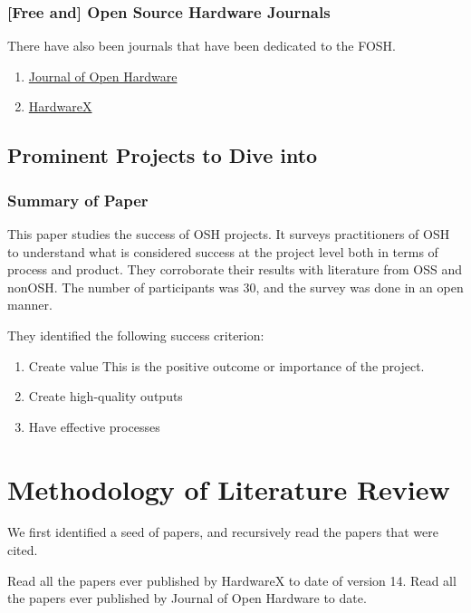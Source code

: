 \documentclass{article}
\begin{document}
\subsubsection{[Free and] Open Source Hardware Journals}
There have also been journals that have been dedicated to the FOSH.
\begin{enumerate}
    \item \href{https://openhardware.metajnl.com/}{Journal of Open Hardware}
    \item \href{https://www.sciencedirect.com/journal/hardwarex}{HardwareX}
\end{enumerate}

\subsection{Prominent Projects to Dive into}

\subsubsection{Summary of Paper}
This paper studies the success of OSH projects.
It surveys practitioners of OSH to understand what is considered success at the project level both in terms of process and product. 
They corroborate their results with literature from OSS and nonOSH.
The number of participants was 30, and the survey was done in an open manner.

They identified the following success criterion:
\begin{enumerate}
    \item Create value
        This is the positive outcome or importance of the project. 
    \item Create high-quality outputs
    \item Have effective processes
\end{enumerate}

\section{Methodology of Literature Review}
We first identified a seed of papers, and recursively read the papers that were cited.

Read all the papers ever published by HardwareX to date of version 14. 
Read all the papers ever published by Journal of Open Hardware to date.

\nocite{*}
\printbibliography
\end{document}
